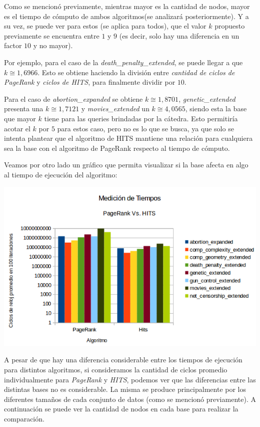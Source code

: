 Como se mencionó previamente, mientras mayor es la cantidad de nodos, mayor es el tiempo de cómputo de ambos algoritmos(se analizará posteriormente). Y a su vez, se puede ver para estos (se aplica para todos), que el valor $k$ propuesto previamente se encuentra entre $1$ y $9$ (es decir, solo hay una diferencia en un factor $10$ y no mayor).
\par 
Por ejemplo, para el caso de la \textit{death\_penalty\_extended}, se puede llegar a que $k \cong 1,6966$. Esto se obtiene haciendo la división entre \textit{cantidad de ciclos de PageRank} y \textit{ciclos de HITS}, para finalmente dividir por $10$. 
\par 
Para el caso de \textit{abortion\_expanded} se obtiene $k \cong 1,8701$, \textit{genetic\_extended} presenta una $ k \cong 1,7121$ y \textit{movies\_extended} un $k \cong 4,0565$, siendo esta la base que mayor $k$ tiene para las queries brindadas por la cátedra. Esto permitiría acotar el $k$ por $5$ para estos caso, pero no es lo que se busca, ya que solo se intenta plantear que el algoritmo de HITS mantiene una relación para cualquiera sea la base con el algoritmo de PageRank respecto al tiempo de cómputo.

Veamos por otro lado un gráfico que permita visualizar si la base afecta en algo al tiempo de ejecución del algoritmo:

	\par 
	\begin{center}
		\includegraphics[scale=0.6]{./img/medicionesTiempo2.png}
	\end{center}
	
	\par 

A pesar de que hay una diferencia considerable entre los tiempos de ejecución para distintos algoritmos, si consideramos la cantidad de ciclos promedio individualmente para \textit{PageRank} y \textit{HITS}, podemos ver que las diferencias entre las distintas bases no es considerable. La misma se produce principalmente por los diferentes tamaños de cada conjunto de datos (como se mencionó previamente). 
A continuación se puede ver la cantidad de nodos en cada base para realizar la comparación. 

